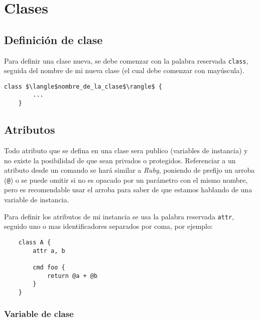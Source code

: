 \documentclass[12pt,letterpaper,titlepage,oneside,openright]{book}
\newcommand{\ruby}{\textit{Ruby}\xspace}
\newcommand{\ttcode}[1]{(\texttt{#1})}
\begin{document}
\section{Clases}

\subsection{Definición de clase}

Para definir una clase nueva, se debe comenzar con la palabra reservada \texttt{class}, seguida del nombre de mi nueva clase (el cual debe comenzar con mayúscula).

\begin{center}
\begin{minipage}{\linewidth}
\begin{lstlisting}[mathescape]
    class $\langle$nombre_de_la_clase$\rangle$ {
        ...
    }
\end{lstlisting}
\end{minipage}
\end{center}

\subsection{Atributos}

Todo atributo que se defina en una clase sera publico (variables de instancia) y no existe la posibilidad de que sean privados o protegidos. Referenciar a un atributo desde un comando se hará similar a \ruby, poniendo de prefijo un arroba \ttcode{@} o se puede omitir si no es opacado por un parámetro con el mismo nombre, pero es recomendable usar el arroba para saber de que estamos hablando de una variable de instancia.

Para definir los atributos de mi instancia se usa la palabra reservada \texttt{attr}, seguido uno o mas identificadores separados por coma, por ejemplo:

\begin{center}
\begin{minipage}{\linewidth}
\begin{lstlisting}
    class A {
        attr a, b

        cmd foo {
            return @a + @b
        }
    }
\end{lstlisting}
\end{minipage}
\end{center}

\subsubsection{Variable de clase}
\end{document}
